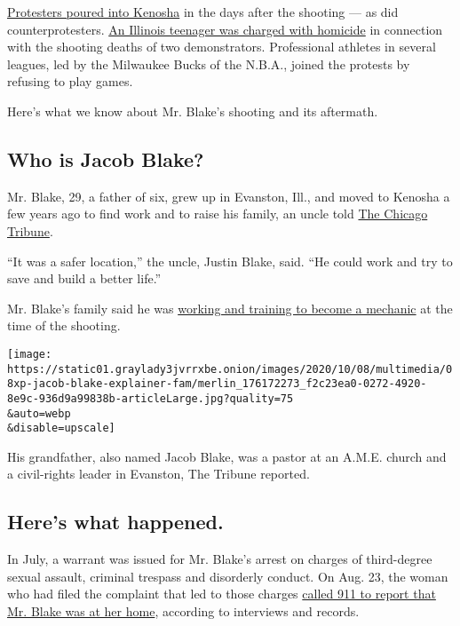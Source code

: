 \href{https://www.nytimes3xbfgragh.onion/2020/08/24/us/kenosha-police-shooting.html}{Protesters
poured into Kenosha} in the days after the shooting --- as did
counterprotesters.
\href{https://www.nytimes3xbfgragh.onion/2020/08/27/us/kyle-rittenhouse-kenosha.html}{An
Illinois teenager was charged with homicide} in connection with the
shooting deaths of two demonstrators. Professional athletes in several
leagues, led by the Milwaukee Bucks of the N.B.A., joined the protests
by refusing to play games.

Here's what we know about Mr. Blake's shooting and its aftermath.

\hypertarget{who-is-jacob-blake}{%
\subsection{Who is Jacob Blake?}\label{who-is-jacob-blake}}

Mr. Blake, 29, a father of six, grew up in Evanston, Ill., and moved to
Kenosha a few years ago to find work and to raise his family, an uncle
told
\href{https://www.chicagotribune.com/suburbs/evanston/ct-evr-jacob-blake-kenosha-police-shooting-evanston-tl-0827-20200824-h63o7uquo5esnf7lnv23njzrx4-story.html}{The
Chicago Tribune}.

``It was a safer location,'' the uncle, Justin Blake, said. ``He could
work and try to save and build a better life.''

Mr. Blake's family said he was
\href{https://www.nytimes3xbfgragh.onion/2020/08/28/us/jacob-blake-shackles-assault.html}{working
and training to become a mechanic} at the time of the shooting.

\texttt{[image: https://static01.graylady3jvrrxbe.onion/images/2020/10/08/multimedia/08xp-jacob-blake-explainer-fam/merlin\_176172273\_f2c23ea0-0272-4920-8e9c-936d9a99838b-articleLarge.jpg?quality=75\\\&auto=webp\\\&disable=upscale]}

His grandfather, also named Jacob Blake, was a pastor at an A.M.E.
church and a civil-rights leader in Evanston, The Tribune reported.

\hypertarget{heres-what-happened}{%
\subsection{Here's what happened.}\label{heres-what-happened}}

In July, a warrant was issued for Mr. Blake's arrest on charges of
third-degree sexual assault, criminal trespass and disorderly conduct.
On Aug. 23, the woman who had filed the complaint that led to those
charges
\href{https://www.nytimes3xbfgragh.onion/2020/08/28/us/jacob-blake-shackles-assault.html}{called
911 to report that Mr. Blake was at her home}, according to interviews
and records.

